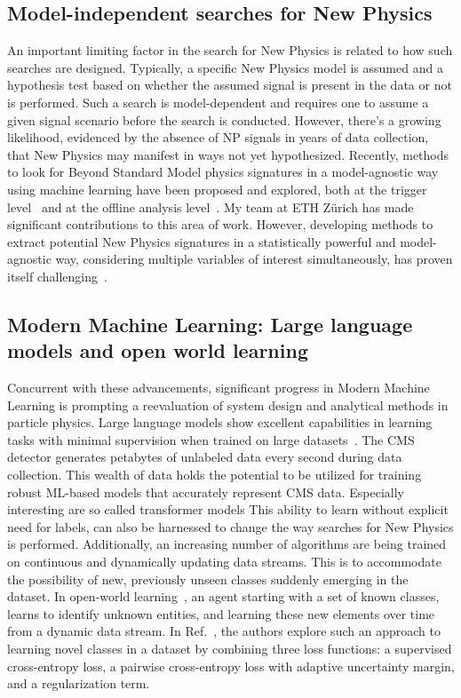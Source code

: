 \documentclass[12pt]{iopart}
\begin{document}
\subsection{Model-independent searches for New Physics}
An important limiting factor in the search for New Physics is related to how such searches are designed. Typically, a specific New Physics model is assumed and a hypothesis test based on whether the assumed signal is present in the data or not is performed. Such a search is model-dependent and requires one to assume a given signal scenario before the search is conducted. However, there's a growing likelihood, evidenced by the absence of NP signals in years of data collection, that New Physics may manifest in ways not yet hypothesized. Recently, methods to look for Beyond Standard Model physics signatures in a model-agnostic way using machine learning have been proposed and explored, both at the trigger level~\cite{CMS-DP-2023-079,BELIS2024100091} and at the offline analysis level~\cite{Harris:2881089,BELIS2024100091}. My team at ETH Zürich has made significant contributions to this area of work. However, developing methods to extract potential New Physics signatures in a statistically powerful and model-agnostic way, considering multiple variables of interest simultaneously, has proven itself challenging~\cite{D_Agnolo_2019}.

\subsection{Modern Machine Learning: Large language models and open world learning}
Concurrent with these advancements, significant progress in Modern Machine Learning is prompting a reevaluation of system design and analytical methods in particle physics. Large language models show excellent capabilities in learning tasks with minimal supervision when trained on large datasets~\cite{Radford2019LanguageMA,brown2020language}. The CMS detector generates petabytes of unlabeled data every second during data collection. This wealth of data holds the potential to be utilized for training robust ML-based models that accurately represent CMS data. Especially interesting are so called transformer models
This ability to learn without explicit need for labels, can also be harnessed to change the way searches for New Physics is performed. 
Additionally, an increasing number of algorithms are being trained on continuous and dynamically updating data streams. This is to accommodate the possibility of new, previously unseen classes suddenly emerging in the dataset.
In open-world learning~\cite{jafarzadeh2022review}, an agent starting with a set of known classes, learns to identify unknown entities, and learning these new elements over time from a dynamic data stream. In Ref.~\cite{cao2022openworld}, the authors explore such an approach to learning novel classes in a dataset by combining three loss functions: a supervised cross-entropy loss, a pairwise cross-entropy loss with adaptive uncertainty margin, and a regularization term.
\end{document}
